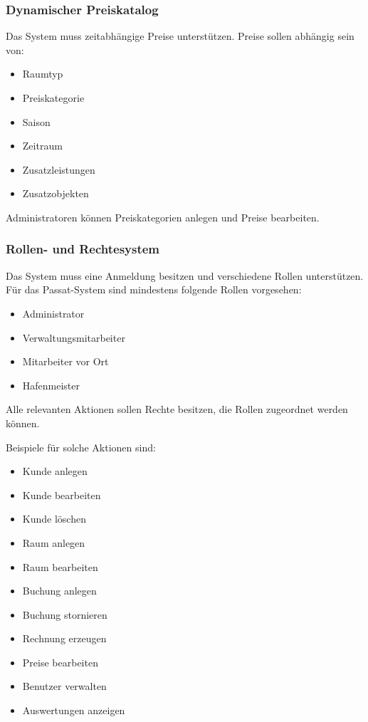 \subsubsection{Dynamischer Preiskatalog}

Das System muss zeitabhängige Preise unterstützen. Preise sollen abhängig sein von:

\begin{itemize}
\item Raumtyp
\item Preiskategorie
\item Saison
\item Zeitraum
\item Zusatzleistungen
\item Zusatzobjekten
\end{itemize}

Administratoren können Preiskategorien anlegen und Preise bearbeiten.

\subsubsection{Rollen- und Rechtesystem}

Das System muss eine Anmeldung besitzen und verschiedene Rollen unterstützen. Für das Passat-System sind mindestens folgende Rollen vorgesehen:

\begin{itemize}
\item Administrator
\item Verwaltungsmitarbeiter
\item Mitarbeiter vor Ort
\item Hafenmeister
\end{itemize}

Alle relevanten Aktionen sollen Rechte besitzen, die Rollen zugeordnet werden können.

Beispiele für solche Aktionen sind:

\begin{itemize}
\item Kunde anlegen
\item Kunde bearbeiten
\item Kunde löschen
\item Raum anlegen
\item Raum bearbeiten
\item Buchung anlegen
\item Buchung stornieren
\item Rechnung erzeugen
\item Preise bearbeiten
\item Benutzer verwalten
\item Auswertungen anzeigen
\end{itemize}

